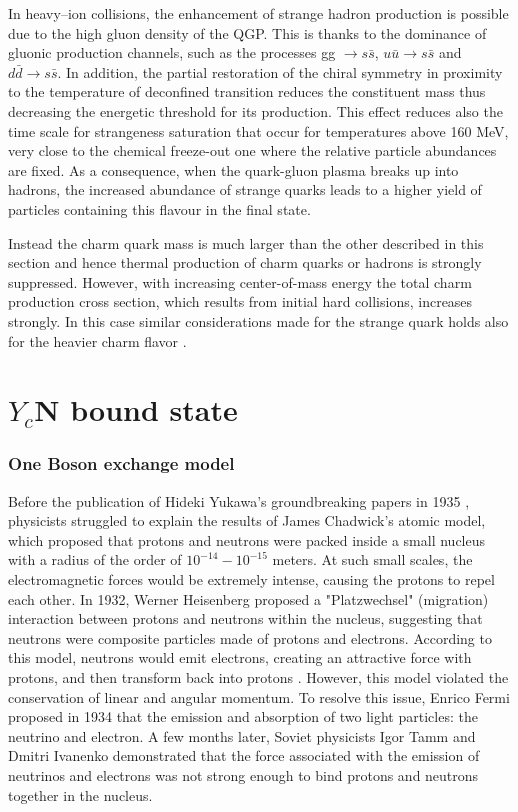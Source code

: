 \documentclass[12pt,a4paper]{book}
\begin{document}
	In heavy–ion collisions, the enhancement of strange hadron production is possible due to the high gluon density of the QGP. This is thanks to the dominance of gluonic production channels, such as the processes gg $\rightarrow s \bar{s}$, $u \bar{u}\rightarrow s \bar{s}$ and $d \bar{d} \rightarrow s \bar{s}$. In addition, the partial restoration of the chiral symmetry in proximity to the temperature of deconfined transition reduces the constituent mass thus decreasing the energetic threshold for its production. This effect reduces also the time scale for strangeness saturation that occur for temperatures above 160 MeV, very close to the chemical freeze-out one where the relative particle abundances are fixed. As a consequence, when the quark-gluon plasma breaks up into hadrons, the increased abundance of strange quarks leads to a higher yield of particles containing this flavour in the final state.
	
	Instead the charm quark mass is much larger than the other described in this section and hence thermal production of charm quarks or hadrons is strongly suppressed. However, with increasing center-of-mass energy the total charm production cross section, which results from initial hard collisions, increases strongly. In this case similar considerations made for the strange quark holds also for the heavier charm flavor \cite{Andronic_2021}.
	
	
	
	
	\FloatBarrier
	
	\chapter{$Y_c$N bound state}
	
	\subsection{One Boson exchange model}
	Before the publication of Hideki Yukawa's groundbreaking papers in 1935 \cite{yukawa}, physicists struggled to explain the results of James Chadwick's atomic model, which proposed that protons and neutrons were packed inside a small nucleus with a radius of the order of $10^{-14}-10^{-15}$ meters. At such small scales, the electromagnetic forces would be extremely intense, causing the protons to repel each other. In 1932, Werner Heisenberg proposed a "Platzwechsel" (migration) interaction between protons and neutrons within the nucleus, suggesting that neutrons were composite particles made of protons and electrons. According to this model, neutrons would emit electrons, creating an attractive force with protons, and then transform back into protons \cite{heisemerg}. However, this model violated the conservation of linear and angular momentum. To resolve this issue, Enrico Fermi proposed in 1934 that the emission and absorption of two light particles: the neutrino and electron. A few months later, Soviet physicists Igor Tamm and Dmitri Ivanenko demonstrated that the force associated with the emission of neutrinos and electrons was not strong enough to bind protons and neutrons together in the nucleus.
	
\end{document}
